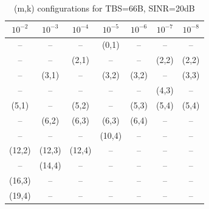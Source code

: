 \begin{table}[ht]
\centering
\caption{(m,k) configurations for TBS=66B, SINR=20dB}
\label{tab:conf_{66B_20dB}}
\begin{tabular}{ccccccc}
\hline
$10^{-2}$ & $10^{-3}$ & $10^{-4}$ & $10^{-5}$ & $10^{-6}$ & $10^{-7}$ & $10^{-8}$ \\ \hline
-- & -- & -- & (0,1) & -- & -- & -- \\
-- & -- & (2,1) & -- & -- & (2,2) & (2,2) \\
-- & (3,1) & -- & (3,2) & (3,2) & -- & (3,3) \\
-- & -- & -- & -- & -- & (4,3) & -- \\
(5,1) & -- & (5,2) & -- & (5,3) & (5,4) & (5,4) \\
-- & (6,2) & (6,3) & (6,3) & (6,4) & -- & -- \\
-- & -- & -- & (10,4) & -- & -- & -- \\
(12,2) & (12,3) & (12,4) & -- & -- & -- & -- \\
-- & (14,4) & -- & -- & -- & -- & -- \\
(16,3) & -- & -- & -- & -- & -- & -- \\
(19,4) & -- & -- & -- & -- & -- & -- \\
\hline
\end{tabular}
\end{table}